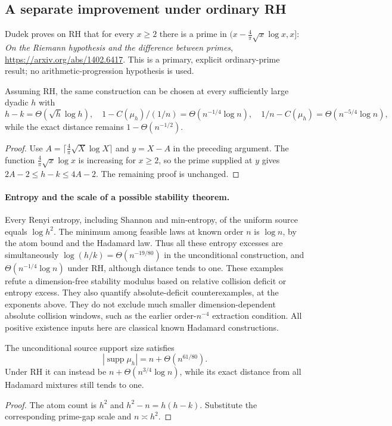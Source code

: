 \subsection{A separate improvement under ordinary RH}
Dudek proves on RH that for every $x\ge2$ there is a prime in
$(x-\frac4\pi\sqrt{x}\log x,x]$:
\emph{On the Riemann hypothesis and the difference between primes},
\url{https://arxiv.org/abs/1402.6417}. This is a primary, explicit
ordinary-prime result; no arithmetic-progression hypothesis is used.
\begin{corollary}\label{cor:stability-rh-rate}
Assuming RH, the same construction can be chosen at every sufficiently
large dyadic $h$ with
\[
 h-k=\Theta(\sqrt h\log h),\quad
 1-C(\mu_h)/(1/n)=\Theta(n^{-1/4}\log n),\quad
 1/n-C(\mu_h)=\Theta(n^{-5/4}\log n),
\]
while the exact distance remains $1-\Theta(n^{-1/2})$.
\end{corollary}
\begin{proof}
Use $A=\lceil\frac4\pi\sqrt X\log X\rceil$ and $y=X-A$ in the
preceding argument. The function $\frac4\pi\sqrt x\log x$ is increasing
for $x\ge2$, so the prime supplied at $y$ gives
$2A-2\le h-k\le4A-2$. The remaining proof is unchanged.
\end{proof}

\paragraph{Entropy and the scale of a possible stability theorem.}
Every Renyi entropy, including Shannon and min-entropy, of the uniform
source equals $\log h^2$. The minimum among feasible laws at known order
$n$ is $\log n$, by the atom bound and the Hadamard law. Thus all these
entropy excesses are simultaneously
$\log(h/k)=\Theta(n^{-19/80})$ in the unconditional construction,
and $\Theta(n^{-1/4}\log n)$ under RH, although distance tends to one.
These examples refute a dimension-free stability modulus based on relative
collision deficit or entropy excess. They also quantify absolute-deficit
counterexamples, at the exponents above. They do not exclude much smaller
dimension-dependent absolute collision windows, such as the earlier
order-$n^{-4}$ extraction condition. All positive existence inputs here
are classical known Hadamard constructions.

\begin{corollary}
\label{cor:stability-support-excess}
The unconditional source support size satisfies
\[
 |\operatorname{supp}\mu_h|=n+\Theta(n^{61/80}).
\]
Under RH it can instead be $n+\Theta(n^{3/4}\log n)$, while its exact
distance from all Hadamard mixtures still tends to one.
\end{corollary}
\begin{proof}
The atom count is $h^2$ and $h^2-n=h(h-k)$. Substitute the corresponding
prime-gap scale and $n\asymp h^2$.
\end{proof}
